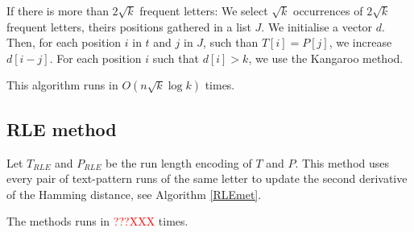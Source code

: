 \documentclass[preprint,12pt]{elsarticle}
\begin{document}
If there is more than $2\sqrt{k}$ frequent letters:
We select $\sqrt{k}$ occurrences of $2\sqrt{k}$ frequent letters,
theirs positions gathered in a list $J$.
We initialise a vector $d$.
Then, for each position $i$ in $t$ and $j$ in $J$, such than $T[i] = P[j]$,
we increase $d[i-j]$.
For each position $i$ such that $d[i]>k$, we use the Kangaroo method.

This algorithm runs in $O(n\sqrt{k} \log k)$ times.












\subsection{RLE method}

Let $T_{RLE}$ and $P_{RLE}$ be the run length encoding of $T$ and $P$.
This method uses every pair of text-pattern runs of the same letter
to update the second derivative of the Hamming distance,
see Algorithm \ref{RLEmet}.

The methods runs in \textcolor{red}{???XXX} times.
\end{document}
